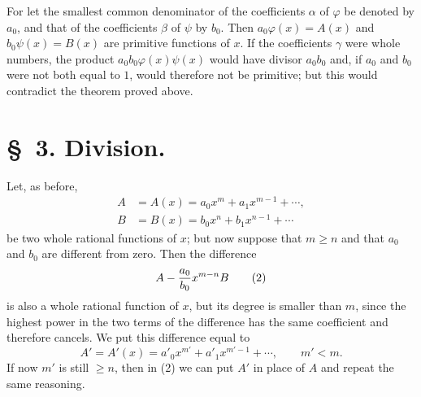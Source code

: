 \documentclass[11pt]{article}
\begin{document}
For let the smallest common denominator of the coefficients $\alpha$ of $\varphi$ be denoted by $a_0$, and that of the coefficients $\beta$ of $\psi$ by $b_0$. Then $a_0\varphi(x)=A(x)$ and $b_0\psi(x)=B(x)$ are primitive functions of $x$. If the coefficients $\gamma$ were whole numbers, the product $a_0b_0\varphi(x)\psi(x)$ would have divisor $a_0b_0$ and, if $a_0$ and $b_0$ were not both equal to $1$, would therefore not be primitive; but this would contradict the theorem proved above.

\section*{\S~3. Division.}

Let, as before,
\begin{equation}
\begin{aligned}
 A&=A(x)=a_0x^m+a_1x^{m-1}+\cdots,\\
 B&=B(x)=b_0x^n+b_1x^{n-1}+\cdots
\end{aligned}
\tag{1}
\end{equation}
be two whole rational functions of $x$; but now suppose that $m\ge n$ and that $a_0$ and $b_0$ are different from zero. Then the difference
\begin{equation}
 A-{a_0\over b_0}x^{m-n}B
\tag{2}
\end{equation}
is also a whole rational function of $x$, but its degree is smaller than $m$, since the highest power in the two terms of the difference has the same coefficient and therefore cancels. We put this difference equal to
\begin{equation}
 A'=A'(x)=a'_0x^{m'}+a'_1x^{m'-1}+\cdots,
 \qquad m'<m.
\tag{3}
\end{equation}
If now $m'$ is still $\ge n$, then in (2) we can put $A'$ in place of $A$ and repeat the same reasoning.
\end{document}
